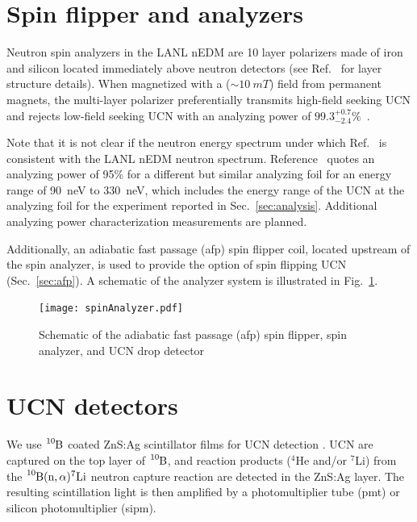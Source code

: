 
\section{Spin flipper and analyzers}\label{sec:spin_flipper_analyzer}


Neutron spin analyzers in the LANL nEDM are 10 layer polarizers made of iron and silicon located immediately above neutron detectors (see Ref.~\cite{ThorstenThesis} for layer structure details). When magnetized with a ($\sim \qty{10}{mT}$) field from permanent magnets, the multi-layer polarizer preferentially transmits high-field seeking UCN and rejects low-field seeking UCN with an analyzing power of $99.3^{+0.7}_{-2.4}\%$~\cite{ThorstenThesis}.

Note that it is not clear if the neutron energy spectrum under which Ref.~\cite{ThorstenThesis} is consistent with the LANL nEDM neutron spectrum. Reference~\cite{afach_device_2015} quotes an analyzing power of 95\% for a different but similar analyzing foil for an energy range of 90~neV to 330~neV, which includes the energy range of the UCN at the analyzing foil for the experiment reported in Sec.~\ref{sec:analysis}. Additional analyzing power characterization measurements are planned.

Additionally, an adiabatic fast passage (\acrshort{afp}) spin flipper coil, located upstream of the spin analyzer, is used to provide the option of spin flipping UCN (Sec.~\ref{sec:afp}). A schematic of the analyzer system is illustrated in Fig.~\ref{fig:SpinAnalyzer}.

\begin{figure}
    \centering
    \texttt{[image: spinAnalyzer.pdf]}
    \caption{Schematic of the adiabatic fast passage (\acrshort{afp}) spin flipper, spin analyzer, and UCN drop detector}
    \label{fig:SpinAnalyzer}
\end{figure}


\section{UCN detectors}\label{sec:ucn_detectors}


We use $\ce{^{10}B}$ coated ZnS:Ag scintillator films for UCN detection \cite{jeph_b10_2011}. UCN are captured on the top layer of $\ce{^{10}B}$, and reaction products ($^4$He and/or $^7$Li) from the $\ce{^{10}B}(\text{n},\alpha)^7\text{Li}$ neutron capture reaction are detected in the ZnS:Ag layer. The resulting scintillation light is then amplified by a photomultiplier tube (\acrshort*{pmt}) or silicon photomultiplier (\acrshort*{sipm}).

